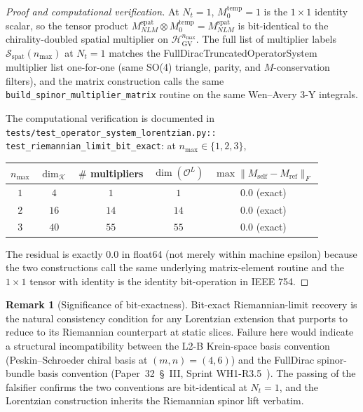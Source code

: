 \documentclass[11pt,a4paper]{article}
\theoremstyle{plain}
\theoremstyle{definition}
\newtheorem{remark}[theorem]{Remark}
\newcommand{\nmax}{n_{\max}}
\newcommand{\Nt}{N_t}
\newcommand{\Krein}{\mathcal{K}}
\newcommand{\Op}{\mathcal{O}}
\newcommand{\Frob}[1]{\lVert #1 \rVert_{F}}
\newcommand{\HGV}{\mathcal{H}_{\mathrm{GV}}}
\newcommand{\spat}{\mathrm{spat}}
\newcommand{\temp}{\mathrm{temp}}
\begin{document}
\begin{proof}[Proof and computational verification]
At $\Nt = 1$, $M_0^{\temp} = 1$ is the $1 \times 1$ identity scalar,
so the tensor product $M^{\spat}_{NLM} \otimes M_0^{\temp} =
M^{\spat}_{NLM}$ is bit-identical to the chirality-doubled spatial
multiplier on $\HGV^{\nmax}$. The full list of multiplier labels
$\mathcal{S}_{\spat}(\nmax)$ at $\Nt = 1$ matches the
FullDiracTruncatedOperatorSystem multiplier list one-for-one
(same SO(4) triangle, parity, and $M$-conservation filters), and the
matrix construction calls the same
\texttt{build\_spinor\_multiplier\_matrix} routine on the same
Wen--Avery 3-Y integrals.

The computational verification is documented in
\texttt{tests/test\_operator\_system\_lorentzian.py::%
test\_riemannian\_limit\_bit\_exact}: at $\nmax \in \{1, 2, 3\}$,

\medskip
\begin{center}\renewcommand{\arraystretch}{1.20}
\begin{tabular}{c|c|c|c|c}
$\nmax$ & $\dim_\Krein$ & $\#$ multipliers
   & $\dim(\Op^L)$ & $\max \Frob{M_{\mathrm{self}} - M_{\mathrm{ref}}}$ \\
\hline
$1$ & $4$ & $1$ & $1$ & $0.0$ (exact) \\
$2$ & $16$ & $14$ & $14$ & $0.0$ (exact) \\
$3$ & $40$ & $55$ & $55$ & $0.0$ (exact) \\
\end{tabular}
\end{center}
\medskip

The residual is exactly $0.0$ in float64 (not merely within machine
epsilon) because the two constructions call the same underlying
matrix-element routine and the $1 \times 1$ tensor with identity is
the identity bit-operation in IEEE 754.
\end{proof}

\begin{remark}[Significance of bit-exactness]\label{rem:bit_exact}
Bit-exact Riemannian-limit recovery is the natural consistency
condition for any Lorentzian extension that purports to reduce to its
Riemannian counterpart at static slices. Failure here would indicate
a structural incompatibility between the L2-B Krein-space basis
convention (Peskin--Schroeder chiral basis at $(m, n) = (4, 6)$) and
the FullDirac spinor-bundle basis convention (Paper~32~\S~III, Sprint
WH1-R3.5~\cite{paper32}). The passing of the falsifier confirms the
two conventions are bit-identical at $\Nt = 1$, and the Lorentzian
construction inherits the Riemannian spinor lift verbatim.
\end{remark}
\end{document}

